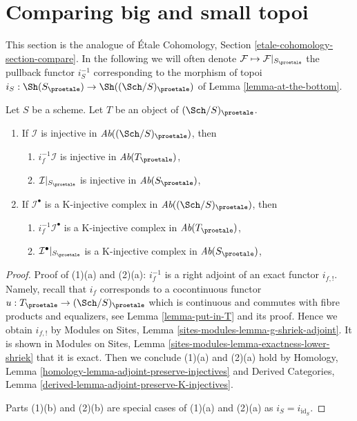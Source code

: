 \section{Comparing big and small topoi}
\label{section-compare}

\noindent
This section is the analogue of \'Etale Cohomology, Section
\ref{etale-cohomology-section-compare}. In the following we
will often denote $\mathcal{F} \mapsto \mathcal{F}|_{S_\proetale}$
the pullback functor $i_S^{-1}$ corresponding to
the morphism of topoi $i_S : \Sh(S_\proetale) \to \Sh((\Sch/S)_\proetale)$
of Lemma \ref{lemma-at-the-bottom}.

\begin{lemma}
\label{lemma-compare-injectives}
Let $S$ be a scheme. Let $T$ be an object of $(\Sch/S)_\proetale$.
\begin{enumerate}
\item If $\mathcal{I}$ is injective in $\textit{Ab}((\Sch/S)_\proetale)$, then
\begin{enumerate}
\item $i_f^{-1}\mathcal{I}$ is injective in $\textit{Ab}(T_\proetale)$,
\item $\mathcal{I}|_{S_\proetale}$ is injective in $\textit{Ab}(S_\proetale)$,
\end{enumerate}
\item If $\mathcal{I}^\bullet$ is a K-injective complex
in $\textit{Ab}((\Sch/S)_\proetale)$, then
\begin{enumerate}
\item $i_f^{-1}\mathcal{I}^\bullet$ is a K-injective complex in
$\textit{Ab}(T_\proetale)$,
\item $\mathcal{I}^\bullet|_{S_\proetale}$ is a K-injective complex in
$\textit{Ab}(S_\proetale)$,
\end{enumerate}
\end{enumerate}
\end{lemma}

\begin{proof}
Proof of (1)(a) and (2)(a): $i_f^{-1}$ is a right adjoint of an
exact functor $i_{f, !}$. Namely, recall that $i_f$ corresponds
to a cocontinuous functor $u : T_\proetale \to (\Sch/S)_\proetale$
which is continuous and commutes with fibre products and equalizers, see
Lemma \ref{lemma-put-in-T} and its proof. Hence we obtain $i_{f, !}$ by
Modules on Sites, Lemma \ref{sites-modules-lemma-g-shriek-adjoint}.
It is shown in Modules on Sites, Lemma
\ref{sites-modules-lemma-exactness-lower-shriek} that it is exact.
Then we conclude (1)(a) and (2)(a) hold by
Homology, Lemma \ref{homology-lemma-adjoint-preserve-injectives} and
Derived Categories, Lemma \ref{derived-lemma-adjoint-preserve-K-injectives}.

\medskip\noindent
Parts (1)(b) and (2)(b) are special cases of (1)(a) and (2)(a)
as $i_S = i_{\text{id}_S}$.
\end{proof}

